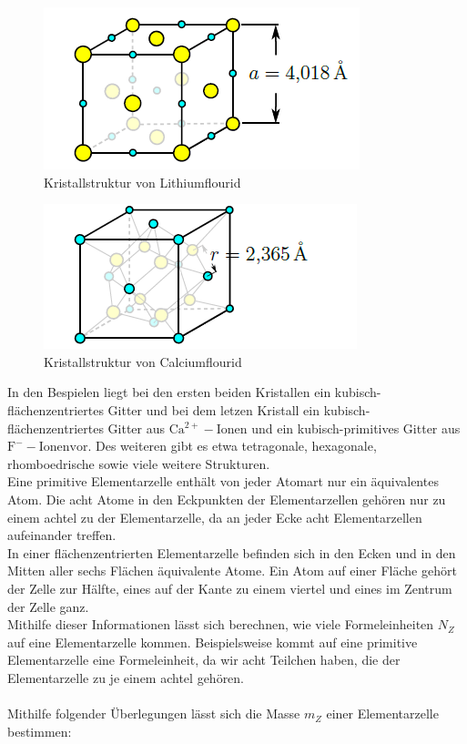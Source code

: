 \documentclass[12pt,a4paper,titlepage,headinclude,bibtotoc]{scrartcl}
\begin{document}
\begin{figure} [h]
\begin{center}
\includegraphics[scale=0.7]{Lithiumflourid.png} \end{center}
\caption{Kristallstruktur von Lithiumflourid}
\end{figure}

\begin{figure} [h]
\begin{center}
\includegraphics[scale=0.7]{Calciumflourid.png} \end{center}
\caption{Kristallstruktur von Calciumflourid}
\end{figure}

\vspace{10cm}
In den Bespielen liegt bei den ersten beiden Kristallen ein kubisch-flächenzentriertes Gitter und bei dem letzen Kristall ein kubisch-flächenzentriertes Gitter aus $\mathrm {Ca^{2+}-Ionen}$ und ein kubisch-primitives Gitter aus $ \mathrm {F^{-}-Ionen vor}$. Des weiteren gibt es etwa tetragonale, hexagonale, rhomboedrische sowie viele weitere Strukturen.\\ Eine primitive Elementarzelle enthält von jeder Atomart nur ein äquivalentes Atom. Die acht Atome in den Eckpunkten der Elementarzellen gehören nur zu einem achtel zu der Elementarzelle, da an jeder Ecke acht Elementarzellen aufeinander treffen.\\
In einer flächenzentrierten Elementarzelle befinden sich in den Ecken und in den Mitten aller sechs Flächen äquivalente Atome. Ein Atom auf einer Fläche gehört der Zelle zur Hälfte, eines auf der Kante zu einem viertel und eines im Zentrum der Zelle ganz.\\
Mithilfe dieser Informationen lässt sich berechnen, wie viele Formeleinheiten $N_{Z}$ auf eine Elementarzelle kommen. Beispielsweise kommt auf eine primitive Elementarzelle eine Formeleinheit, da wir acht Teilchen haben, die der Elementarzelle zu je einem achtel gehören.\\\\ Mithilfe folgender Überlegungen lässt sich die Masse $m_{Z}$ einer Elementarzelle bestimmen:
\end{document}
